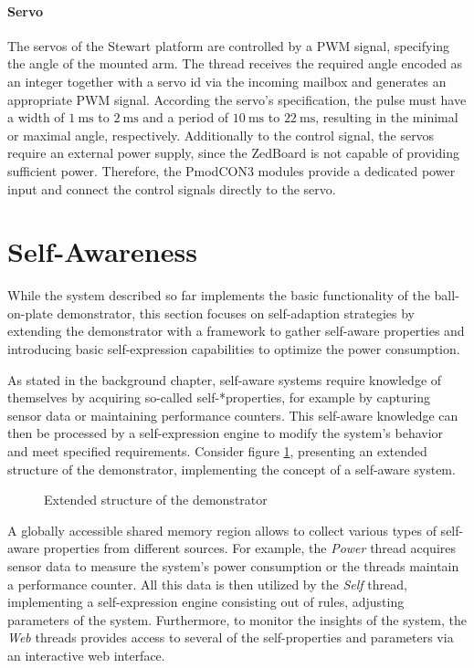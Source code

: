 \paragraph{Servo} The servos of the Stewart platform are controlled by a
\ac{PWM} signal, specifying the angle of the mounted arm. The thread receives
the required angle encoded as an integer together with a servo id via the
incoming mailbox and generates an appropriate \ac{PWM} signal. According the
servo's specification, the pulse must have a width of $\SI{1}{\milli\second}$
to $\SI{2}{\milli\second}$ and a period of $\SI{10}{\milli\second}$ to
$\SI{22}{\milli\second}$, resulting in the minimal or maximal angle,
respectively. Additionally to the control signal, the servos require an
external power supply, since the ZedBoard is not capable of providing
sufficient power. Therefore, the PmodCON3 modules provide a dedicated power
input and connect the control signals directly to the servo.

\section{Self-Awareness}
While the system described so far implements the basic functionality of the
ball-on-plate demonstrator, this section focuses on self-adaption strategies
by extending the demonstrator with a framework to gather self-aware properties
and introducing basic self-expression capabilities to optimize the power
consumption.

As stated in the background chapter, self-aware systems require knowledge of
themselves by acquiring so-called self-*properties, for example by capturing
sensor data or maintaining performance counters. This self-aware knowledge can
then be processed by a self-expression engine to modify the system's behavior
and meet specified requirements. Consider figure \ref{fig:demo_selfaware},
presenting an extended structure of the demonstrator, implementing the concept
of a self-aware system.
\begin{figure}
	\centering
	\caption{Extended structure of the demonstrator}
	\label{fig:demo_selfaware}
\end{figure}
A globally accessible shared memory region allows to collect various types of
self-aware properties from different sources. For example, the \emph{Power}
thread acquires sensor data to measure the system's power consumption or the
threads maintain a performance counter. All this data is then utilized by the
\emph{Self} thread, implementing a self-expression engine consisting out of
rules, adjusting parameters of the system. Furthermore, to monitor the
insights of the system, the \emph{Web} threads provides access to several of
the self-properties and parameters via an interactive web interface.

